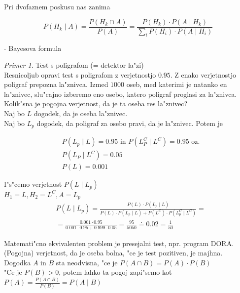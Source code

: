 \documentclass[a4paper,12pt]{article}
\theoremstyle{definition}
\theoremstyle{remark}
\newtheorem*{ex}{Primer}
\begin{document}
Pri dvofaznem poskusu nas zanima 

\begin{equation*}
    P(H_k \mid A) = \frac{P(H_k \cap A)}{P(A)} =
    \frac{P(H_k) \cdot P(A \mid H_k)}{\sum_i P(H_i) \cdot P(A \mid H_i)}
\end{equation*}

- Bayesova formula

\begin{ex}
    Test s poligrafom (= detektor la"zi) \\
    Resnicoljub opravi test s poligrafom z verjetnostjo $0.95$. Z enako verjetnostjo poligraf prepozna la"znivca.
    Izmed $1000$ oseb, med katerimi je natanko en la"znivec, slu"cajno izberemo eno osebo, katero poligraf
    proglasi za la"znivca. Kolik"sna je pogojna verjetnost, da je ta oseba res la"znivec? \\
    Naj bo $L$ dogodek, da je oseba la"znivec. \\
    Naj bo $L_p$ dogodek, da poligraf za osebo pravi, da je la"znivec. Potem je

    \begin{align*}
        &P(L_p \mid L) = 0.95 \text{ in } P(L_P^C \mid L^C) = 0.95 \text{ oz.} \\
        &P(L_P \mid L^C) = 0.05 \\
        &P(L) = 0.001
    \end{align*}

    I"s"cemo verjetnost $P(L \mid L_p)$ \\
    $H_1 = L, H_2 = L^C, A = L_p$ \\

    \begin{align*}
        &P(L \mid L_p) = \frac{P(L) \cdot P(L_p \mid L)}{P(L) \cdot P(L_p \mid L) + P(L^C) \cdot P(L_p^C \mid L^C)} = \\
        &= \frac{0.001 \cdot 0.95}{0.001 \cdot 0.95 + 0.999 \cdot 0.05} = \frac{95}{5050} \doteq 0.02 = \frac{1}{50}
    \end{align*}
\end{ex}

Matemati"cno ekvivalenten problem je presejalni test, npr. program DORA. (Pogojna) verjetnost, da je oseba bolna, "ce
je test pozitiven, je majhna. \\
Dogodka $A$ in $B$ sta neodvisna, "ce je $P(A \cap B) = P(A) \cdot P(B)$ \\
"Ce je $P(B) > 0$, potem lahko ta pogoj zapi"semo kot $P(A) = \frac{P(A \cap B)}{P(B)} = P(A \mid B)$
\end{document}
